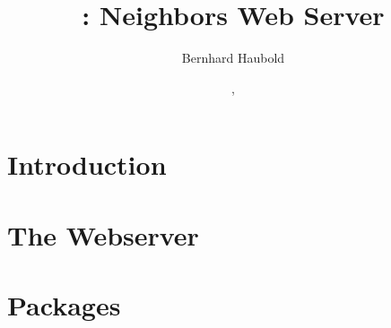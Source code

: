 \documentclass[a4paper]{report}
\begin{document}
\pagestyle{noweb}

\title{: Neighbors Web Server}
\author{Bernhard Haubold}
\date{\!\!, }
\maketitle
\tableofcontents
\chapter{Introduction}

\chapter{The Webserver}

\chapter{Packages}


% 
\end{document}
